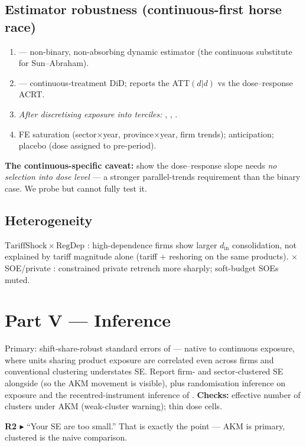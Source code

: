 \documentclass[11pt]{article}
\newcommand{\din}{d_{\mathrm{in}}}
\newcommand{\R}[1]{\par\smallskip\noindent\textbf{\textcolor{red!55!black}{R2 $\blacktriangleright$}} #1}
\begin{document}
\subsection{Estimator robustness (continuous-first horse race)}
\begin{enumerate}[leftmargin=1.6em,noitemsep]
  \item \citet{dechaisemartin2020} --- non-binary, non-absorbing dynamic estimator
        (the continuous substitute for Sun--Abraham).
  \item \citet{callawaygoodmanbacon2024} --- continuous-treatment DiD; reports the
        ATT$(d|d)$ vs the dose--response ACRT.
  \item \emph{After discretising exposure into terciles:} \citet{sunabraham2021},
        \citet{callawaysantanna2021}, \citet{borusyak2024}.
  \item FE saturation (sector$\times$year, province$\times$year, firm trends);
        anticipation; placebo (dose assigned to pre-period).
\end{enumerate}
\textbf{The continuous-specific caveat:} \citet{callawaygoodmanbacon2024} show the
dose--response slope needs \emph{no selection into dose level} --- a stronger
parallel-trends requirement than the binary case. We probe but cannot fully test it.

\subsection{Heterogeneity}
$\mathrm{TariffShock}\times\mathrm{RegDep}$ \citep{farrell2019,arjona2023}: high-dependence
firms show larger $\din$ consolidation, not explained by tariff magnitude alone
(tariff $+$ reshoring on the same products). $\times$SOE/private \citep{guariglia2011}:
constrained private retrench more sharply; soft-budget SOEs muted.

\section{Part V --- Inference}
\label{part:inf}
Primary: shift-share-robust standard errors of \citet{adao2019} --- native to
continuous exposure, where units sharing product exposure are correlated even across
firms and conventional clustering understates SE. Report firm- and sector-clustered SE
alongside (so the AKM movement is visible), plus randomisation inference on exposure
and the recentred-instrument inference of \citet{borusyakhull2022}.
\textbf{Checks:} effective number of clusters under AKM (weak-cluster warning); thin
dose cells.
\begin{ref2}
\R{``Your SE are too small.''} That is exactly the \citet{adao2019} point --- AKM is
primary, clustered is the naive comparison.
\end{ref2}
\end{document}
